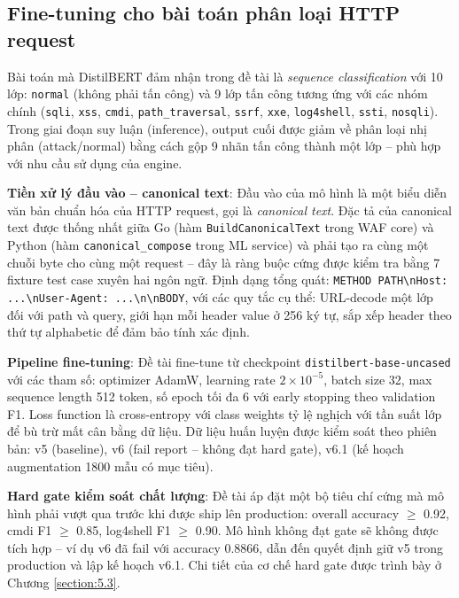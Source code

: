 \documentclass[../DoAn.tex]{subfiles}
\begin{document}
\subsection{Fine-tuning cho bài toán phân loại HTTP request}
\label{subsection:3.3.2}

Bài toán mà DistilBERT đảm nhận trong đề tài là \textit{sequence
classification} với 10 lớp: \texttt{normal} (không phải tấn công) và 9
lớp tấn công tương ứng với các nhóm chính (\texttt{sqli}, \texttt{xss},
\texttt{cmdi}, \texttt{path\_traversal}, \texttt{ssrf}, \texttt{xxe},
\texttt{log4shell}, \texttt{ssti}, \texttt{nosqli}). Trong giai đoạn
suy luận (inference), output cuối được giảm về phân loại nhị phân
(attack/normal) bằng cách gộp 9 nhãn tấn công thành một lớp -- phù hợp với
nhu cầu sử dụng của engine.

\textbf{Tiền xử lý đầu vào -- canonical text}: Đầu vào của mô hình là một
biểu diễn văn bản chuẩn hóa của HTTP request, gọi là \textit{canonical
text}. Đặc tả của canonical text được thống nhất giữa Go (hàm
\texttt{BuildCanonicalText} trong WAF core) và Python (hàm
\texttt{canonical\_compose} trong ML service) và phải tạo ra cùng một
chuỗi byte cho cùng một request -- đây là ràng buộc cứng được kiểm tra
bằng 7 fixture test case xuyên hai ngôn ngữ. Định dạng tổng quát:
\texttt{METHOD PATH\textbackslash nHost: ...\textbackslash nUser-Agent:
...\textbackslash n\textbackslash nBODY}, với các quy tắc cụ thể: URL-decode
một lớp đối với path và query, giới hạn mỗi header value ở 256 ký tự, sắp
xếp header theo thứ tự alphabetic để đảm bảo tính xác định.

\textbf{Pipeline fine-tuning}: Đề tài fine-tune từ checkpoint
\texttt{distilbert-base-uncased} với các tham số: optimizer AdamW, learning
rate \(2 \times 10^{-5}\), batch size 32, max sequence length 512 token,
số epoch tối đa 6 với early stopping theo validation F1. Loss function là
cross-entropy với class weights tỷ lệ nghịch với tần suất lớp để bù trừ
mất cân bằng dữ liệu. Dữ liệu huấn luyện được kiểm soát theo phiên bản:
v5 (baseline), v6 (fail report -- không đạt hard gate), v6.1 (kế hoạch
augmentation 1800 mẫu có mục tiêu).

\textbf{Hard gate kiểm soát chất lượng}: Đề tài áp đặt một bộ tiêu chí
cứng mà mô hình phải vượt qua trước khi được ship lên production: overall
accuracy \(\ge\) 0.92, cmdi F1 \(\ge\) 0.85, log4shell F1 \(\ge\) 0.90. Mô
hình không đạt gate sẽ không được tích hợp -- ví dụ v6 đã fail với accuracy
0.8866, dẫn đến quyết định giữ v5 trong production và lập kế hoạch v6.1.
Chi tiết của cơ chế hard gate được trình bày ở Chương \ref{section:5.3}.
\end{document}
